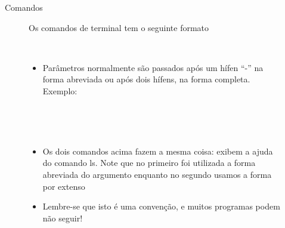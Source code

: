 \documentclass{beamer}
\begin{document}
\begin{frame}{Comandos}
    \begin{figure}[h]
        \centering
        Os comandos de terminal tem o seguinte formato \newline \\
        \begin{shell}
        \end{shell}
        \\
        \begin{itemize}
        \item Parâmetros normalmente são passados após um hífen ``-'' na forma
          abreviada ou após dois hífens, na forma completa. Exemplo:
        \end{itemize}
        \begin{shell}
           \\
        \end{shell}
        \\
        \begin{itemize}
        \item{ Os dois comandos acima fazem a mesma coisa: exibem a ajuda
          do comando ls. Note que no primeiro foi utilizada a forma abreviada
          do argumento enquanto no segundo usamos a forma por extenso}
        \item{ Lembre-se que isto é uma convenção, e muitos programas podem não
          seguir!}
        \end{itemize}
    \end{figure}
\end{frame}
\end{document}
